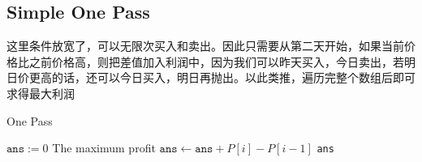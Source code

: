 \subsection{Simple One Pass}
\begin{CJK*}{UTF8}{gbsn}
这里条件放宽了，可以无限次买入和卖出。因此只需要从第二天开始，如果当前价格比之前价格高，则把差值加入利润中，因为我们可以昨天买入，今日卖出，若明日价更高的话，还可以今日买入，明日再抛出。以此类推，遍历完整个数组后即可求得最大利润
\end{CJK*}
\setcounter{algorithm}{0}
\begin{algorithm}[H]
\caption{One Pass}
\begin{algorithmic}[1]
\State $\texttt{ans}:=0$ \Comment The maximum profit
\State $\texttt{ans}\gets \texttt{ans} + P[i]-P[i-1]$
\EndIf
\EndFor
\State \Return \texttt{ans}
\EndProcedure
\end{algorithmic}
\end{algorithm}